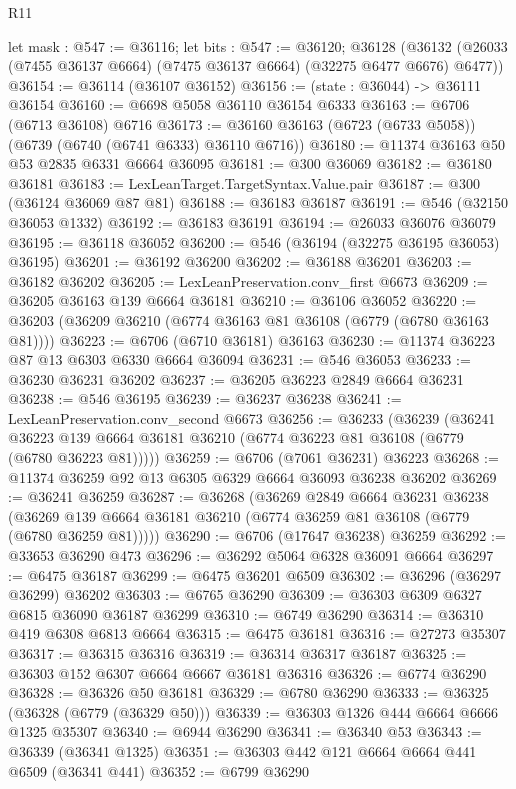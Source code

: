 \begin{lexlean}{R11}
\begin{coremodule}
  let mask : @547 := @36116;
  let bits : @547 := @36120;
  @36128 (@36132 (@26033 (@7455 @36137 @6664) (@7475 @36137 @6664) (@32275 @6477 @6676) @6477))
@36154 := @36114 (@36107 @36152)
@36156 := (state : @36044) -> @36111 @36154
@36160 := @6698 @5058 @36110 @36154 @6333
@36163 := @6706 (@6713 @36108) @6716
@36173 := @36160 @36163 (@6723 (@6733 @5058)) (@6739 (@6740 (@6741 @6333) @36110 @6716))
@36180 := @11374 @36163 @50 @53 @2835 @6331 @6664 @36095
@36181 := @300 @36069
@36182 := @36180 @36181
@36183 := LexLeanTarget.TargetSyntax.Value.pair
@36187 := @300 (@36124 @36069 @87 @81)
@36188 := @36183 @36187
@36191 := @546 (@32150 @36053 @1332)
@36192 := @36183 @36191
@36194 := @26033 @36076 @36079
@36195 := @36118 @36052
@36200 := @546 (@36194 (@32275 @36195 @36053) @36195)
@36201 := @36192 @36200
@36202 := @36188 @36201
@36203 := @36182 @36202
@36205 := LexLeanPreservation.conv_first @6673
@36209 := @36205 @36163 @139 @6664 @36181
@36210 := @36106 @36052
@36220 := @36203 (@36209 @36210 (@6774 @36163 @81 @36108 (@6779 (@6780 @36163 @81))))
@36223 := @6706 (@6710 @36181) @36163
@36230 := @11374 @36223 @87 @13 @6303 @6330 @6664 @36094
@36231 := @546 @36053
@36233 := @36230 @36231 @36202
@36237 := @36205 @36223 @2849 @6664 @36231
@36238 := @546 @36195
@36239 := @36237 @36238
@36241 := LexLeanPreservation.conv_second @6673
@36256 := @36233
    (@36239
      (@36241 @36223 @139 @6664 @36181 @36210 (@6774 @36223 @81 @36108 (@6779 (@6780 @36223 @81)))))
@36259 := @6706 (@7061 @36231) @36223
@36268 := @11374 @36259 @92 @13 @6305 @6329 @6664 @36093 @36238 @36202
@36269 := @36241 @36259
@36287 := @36268
    (@36269
      @2849
      @6664
      @36231
      @36238
      (@36269 @139 @6664 @36181 @36210 (@6774 @36259 @81 @36108 (@6779 (@6780 @36259 @81)))))
@36290 := @6706 (@17647 @36238) @36259
@36292 := @33653 @36290 @473
@36296 := @36292 @5064 @6328 @36091 @6664
@36297 := @6475 @36187
@36299 := @6475 @36201 @6509
@36302 := @36296 (@36297 @36299) @36202
@36303 := @6765 @36290
@36309 := @36303 @6309 @6327 @6815 @36090 @36187 @36299
@36310 := @6749 @36290
@36314 := @36310 @419 @6308 @6813 @6664
@36315 := @6475 @36181
@36316 := @27273 @35307
@36317 := @36315 @36316
@36319 := @36314 @36317 @36187
@36325 := @36303 @152 @6307 @6664 @6667 @36181 @36316
@36326 := @6774 @36290
@36328 := @36326 @50 @36181
@36329 := @6780 @36290
@36333 := @36325 (@36328 (@6779 (@36329 @50)))
@36339 := @36303 @1326 @444 @6664 @6666 @1325 @35307
@36340 := @6944 @36290
@36341 := @36340 @53
@36343 := @36339 (@36341 @1325)
@36351 := @36303 @442 @121 @6664 @6664 @441 @6509 (@36341 @441)
@36352 := @6799 @36290

\end{coremodule}
\end{lexlean}
